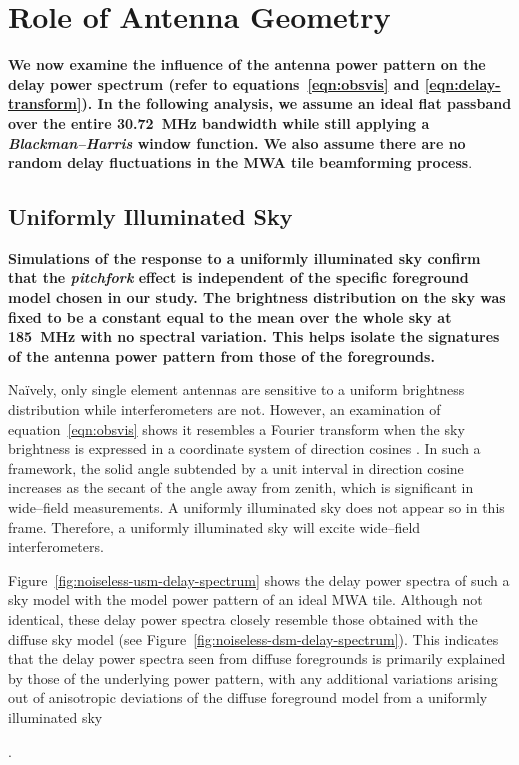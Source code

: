 \documentclass[preprint2,iop,numberedappendix]{emulateapj}
\begin{document}
\section{Role of Antenna Geometry}\label{sec:antenna-shape}

{\bf We now examine the influence of the antenna power pattern on the delay power spectrum (refer to equations~\ref{eqn:obsvis} and \ref{eqn:delay-transform}). In the following analysis, we assume an ideal flat passband over the entire 30.72~MHz bandwidth while still applying a {\it Blackman--Harris} window function. We also assume there are no random delay fluctuations in the MWA tile beamforming process}. 

\subsection{Uniformly Illuminated Sky}\label{sec:USM}

{\bf Simulations of the response to a uniformly illuminated sky confirm that the {\it pitchfork} effect is independent of the specific foreground model chosen in our study. The brightness distribution on the sky was fixed to be a constant equal to the mean over the whole sky at 185~MHz with no spectral variation. This helps isolate the signatures of the antenna power pattern from those of the foregrounds.


Na\"{i}vely, only single element antennas are sensitive to a uniform brightness distribution while interferometers are not. However, an examination of equation~\ref{eqn:obsvis} shows it resembles a Fourier transform when the sky brightness is expressed in a coordinate system of direction cosines \citep{tay99,tho01}. In such a framework, the solid angle subtended by a unit interval in direction cosine increases as the secant of the angle away from zenith, which is significant in wide--field measurements. A uniformly illuminated sky does not appear so in this frame. Therefore, a uniformly illuminated sky will excite wide--field interferometers.

Figure~\ref{fig:noiseless-usm-delay-spectrum} shows the delay power spectra of such a sky model with the model power pattern of an ideal MWA tile. Although not identical, these delay power spectra closely resemble those obtained with the diffuse sky model (see Figure~\ref{fig:noiseless-dsm-delay-spectrum}). This indicates that the delay power spectra seen from diffuse foregrounds is primarily explained by those of the underlying power pattern, with any additional variations arising out of anisotropic deviations of the diffuse foreground model from a uniformly illuminated sky}.
\end{document}
